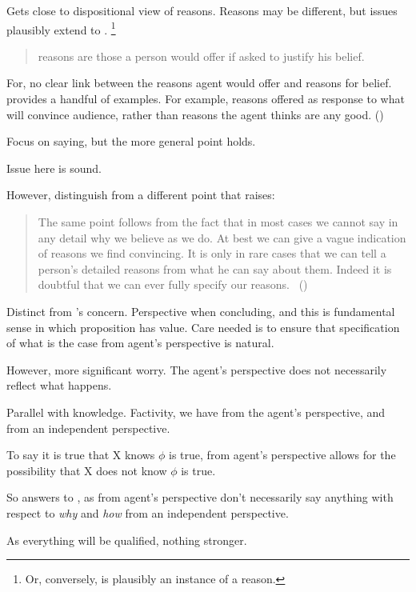 \begin{note}
  Gets close to dispositional view of reasons.
  Reasons may be different, but issues plausibly extend to \support{}.%
  \footnote{
    Or, conversely, \support{} is plausibly an instance of a reason.
  }

  \begin{quote}
    reasons are those a person would offer if asked to justify his belief.
  \end{quote}

  For, no clear link between the reasons agent would offer and reasons for belief.
  \textcite{Harman:1973ww} provides a handful of examples.
  For example, reasons offered as response to what will convince audience, rather than reasons the agent thinks are any good.
  (\citeyear[26--27]{Harman:1973ww})

  Focus on saying, but the more general point holds.

  Issue here is sound.

  However, distinguish from a different point that \citeauthor{Harman:1973ww} raises:

  \begin{quote}
    The same point follows from the fact that in most cases we cannot say in any detail why we believe as we do.
    At best we can give a vague indication of reasons we find convincing.
    It is only in rare cases that we can tell a person’s detailed reasons from what he can say about them.
    Indeed it is doubtful that we can ever fully specify our reasons.%
    \mbox{ }\hfill\mbox{(\citeyear[28]{Harman:1973ww})}
  \end{quote}

  Distinct from \citeauthor{Harman:1973ww}'s concern.
  Perspective when concluding, and this is fundamental sense in which proposition has value.
  Care needed is to ensure that specification of what is the case from agent's perspective is natural.
\end{note}

\begin{note}
  However, more significant worry.
  The agent's perspective does not necessarily reflect what happens.

  Parallel with knowledge.
  Factivity, we have from the agent's perspective, and from an independent perspective.

  To say it is true that X knows \(\phi\) is true, from agent's perspective allows for the possibility that X does not know \(\phi\) is true.

  So answers to \qWhy{}, as from agent's perspective don't necessarily say anything with respect to \emph{why} and \emph{how} from an independent perspective.

  As everything will be qualified, nothing stronger.
\end{note}


